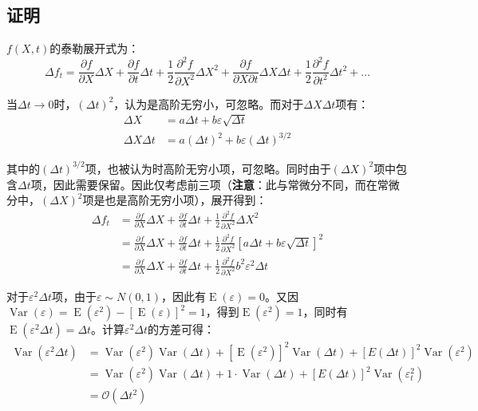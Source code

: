 \documentclass[11pt]{article}
\newcommand{\E}{\operatorname{E}}
\newcommand{\Var}{\operatorname{Var}}
\begin{document}
\subsection*{证明}

$f(X,t)$的泰勒展开式为：
\begin{equation*}
    \Delta f_t = \frac{\partial f}{\partial X} \Delta X + \frac{\partial f}{\partial t} \Delta t + \frac{1}{2} \frac{\partial^2 f}{\partial X^2}\Delta X^2  + \frac{\partial f}{\partial X \partial t}\Delta X \Delta t + \frac{1}{2} \frac{\partial^2 f}{\partial t^2} \Delta t^2 + \dots
\end{equation*}

当$\Delta t \rightarrow 0$时，$(\Delta t)^2$，认为是高阶无穷小，可忽略。而对于$\Delta X \Delta t$项有：
\begin{align*}
    \Delta X &= a\Delta t + b \varepsilon\sqrt{\Delta t} \\
    \Delta X \Delta t &= a(\Delta t)^2 + b \varepsilon(\Delta t)^{3/2}
\end{align*}

其中的$(\Delta t)^{3/2}$项，也被认为时高阶无穷小项，可忽略。同时由于$(\Delta X)^2$项中包含$\Delta t$项，因此需要保留。因此仅考虑前三项（\textbf{注意}：此与常微分不同，而在常微分中，$(\Delta X)^2$项是也是高阶无穷小项），展开得到：
\begin{align*}
    \Delta f_t & = \frac{\partial f}{\partial X} \Delta X + \frac{\partial f}{\partial t} \Delta t + \frac{1}{2} \frac{\partial^2 f}{\partial X^2}\Delta X^2 \\
    & = \frac{\partial f}{\partial X} \Delta X + \frac{\partial f}{\partial t} \Delta t + \frac{1}{2} \frac{\partial^2 f}{\partial X^2} [a\Delta t + b\varepsilon\sqrt{\Delta t}]^2 \\
    & = \frac{\partial f}{\partial X} \Delta X + \frac{\partial f}{\partial t} \Delta t + \frac{1}{2} \frac{\partial^2 f}{\partial X^2} b^2 \varepsilon^2 \Delta t
\end{align*}

对于$\varepsilon^2 \Delta t$项，由于$\varepsilon \sim N(0,1)$，因此有$\E(\varepsilon)=0$。又因$\Var(\varepsilon)=\E(\varepsilon^2)-[\E(\varepsilon)]^2=1$，得到$\E(\varepsilon^2)=1$，同时有$\E(\varepsilon^2 \Delta t) = \Delta t$。计算$\varepsilon^2 \Delta t$的方差可得：
\begin{align*}
    \Var(\varepsilon^2 \Delta t) & = \Var(\varepsilon^2) \Var(\Delta t) + [\E(\varepsilon^2)]^2 \Var(\Delta t) + [E(\Delta t)]^2 \Var(\varepsilon^2) \\
    & = \Var(\varepsilon^2) \Var(\Delta t) + 1 \cdot \Var(\Delta t) + [E(\Delta t)]^2 \Var(\varepsilon_t^2) \\
    & = \mathcal{O}(\Delta t^2)
\end{align*}
\end{document}
